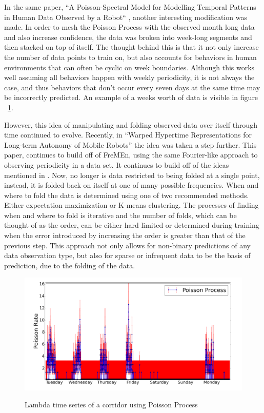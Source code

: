   In the same paper,
  ``A Poisson-Spectral Model for Modelling Temporal Patterns in Human Data Observed by a Robot``
  \cite{Jovan2016}, another interesting modification was made. In order to mesh
  the Poisson Process with the observed month long data and also
  increase confidence, the data was broken into week-long segments and then
  stacked on top of itself. The thought behind this is that it not only
  increase the number of data points to train on, but also accounts for behaviors in human
  environments that can often be cyclic on week boundaries. Although this works well
  assuming all behaviors happen with weekly periodicity, it is not always
  the case, and thus behaviors that don't occur every seven days at the same time
  may be incorrectly predicted. An example of a weeks worth of data is visible
  in figure ~\ref{figure:PSP}.

  However, this idea of manipulating and folding observed data over itself through time
  continued to evolve. Recently, in
  ``Warped Hypertime Representations for Long-term Autonomy of Mobile Robots''
  \cite{krajnik2018} the idea was taken a step further. This paper, continues
  to build off of FreMEn, using the same Fourier-like approach to observing
  periodicity in a data set. It continues to build off of the ideas mentioned
  in \cite{Jovan2016}. Now, no longer is data restricted to being folded at a
  single point, instead, it is folded back on itself at one of many possible
  frequencies. When and where to fold the data is determined using one of two
  recommended methods. Either expectation maximization or K-means clustering.
  The processes of finding when and where to fold is iterative and the number
  of folds, which can be thought of as the order, can be either hard limited
  or determined during training when the error introduced by increasing the
  order is greater than that of the previous step. This approach not only allows
  for non-binary predictions of any data observation type, but also
  for sparse or infrequent data to be the basis of prediction, due to the
  folding of the data.



  \begin{figure}[!htb]
    \centering
    \includegraphics[width=\linewidth]{images/poisson-spectral-process.png}
    \caption{Lambda time series of a corridor using Poisson Process}
    \cite{Jovan2016}
    \label{figure:PSP}
  \end{figure}


